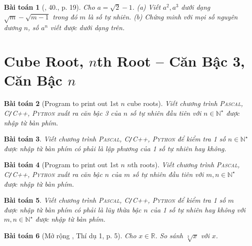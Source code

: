 \documentclass{article}
\newtheorem{baitoan}{Bài toán}
\begin{document}
\begin{baitoan}[\cite{Binh_Toan_9_tap_1}, 40., p. 19]
	Cho $a = \sqrt{2} - 1$. (a) Viết $a^2,a^3$ dưới dạng $\sqrt{m} - \sqrt{m - 1}$ trong đó $m$ là số tự nhiên. (b) Chứng minh với mọi số nguyên dương $n$, số $a^n$ viết được dưới dạng trên.
\end{baitoan}


\section{Cube Root, $n$th Root -- Căn Bậc 3, Căn Bậc $n$}

\begin{baitoan}[Program to print out 1st $n$ cube roots]
	Viết chương trình \textsc{Pascal, C\texttt{/}C++, Python} xuất ra căn bậc 3 của $n$ số tự nhiên đầu tiên với $n\in\mathbb{N}^\star$ được nhập từ bàn phím.
\end{baitoan}

\begin{baitoan}
	Viết chương trình \textsc{Pascal, C\texttt{/}C++, Python} để kiểm tra 1 số $n\in\mathbb{N}^\star$ được nhập từ bàn phím có phải là lập phương của 1 số tự nhiên hay không.
\end{baitoan}

\begin{baitoan}[Program to print out 1st $n$ $n$th roots]
	Viết chương trình \textsc{Pascal, C\texttt{/}C++, Python} xuất ra căn bậc $n$ của $m$ số tự nhiên đầu tiên với $m,n\in\mathbb{N}^\star$ được nhập từ bàn phím.
\end{baitoan}

\begin{baitoan}
	Viết chương trình \textsc{Pascal, C\texttt{/}C++, Python} để kiểm tra 1 số $m$ được nhập từ bàn phím có phải là lũy thừa bậc $n$ của 1 số tự nhiên hay không với $m,n\in\mathbb{N}^\star$ được nhập từ bàn phím.
\end{baitoan}

\begin{baitoan}[Mở rộng \cite{Tuyen_Toan_9}, Thí dụ 1, p. 5]
	Cho $x\in\mathbb{R}$. So sánh $\sqrt[3]{x}$ với $x$.
\end{baitoan}
\end{document}
